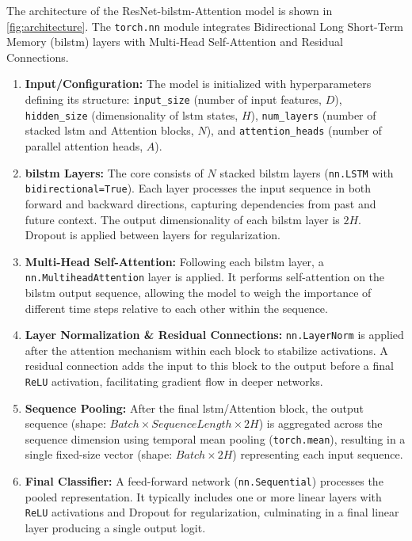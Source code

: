 The architecture of the ResNet-\gls{bilstm}-Attention model is shown in \autoref{fig:architecture}. The \texttt{torch.nn} module integrates Bidirectional Long Short-Term Memory (\gls{bilstm}) layers with Multi-Head Self-Attention and Residual Connections.

\begin{enumerate}
  \item \textbf{Input/Configuration:} The model is initialized with hyperparameters defining its structure: \texttt{input\_size} (number of input features, $D$), \texttt{hidden\_size} (dimensionality of \gls{lstm} states, $H$), \texttt{num\_layers} (number of stacked \gls{lstm} and Attention blocks, $N$), and \texttt{attention\_heads} (number of parallel attention heads, $A$).

  \item \textbf{\gls{bilstm} Layers:} The core consists of $N$ stacked \gls{bilstm} layers (\texttt{nn.LSTM} with \texttt{bidirectional=True}). Each layer processes the input sequence in both forward and backward directions, capturing dependencies from past and future context. The output dimensionality of each \gls{bilstm} layer is $2H$. Dropout is applied between layers for regularization.

  \item \textbf{Multi-Head Self-Attention:} Following each \gls{bilstm} layer, a \texttt{nn.MultiheadAttention} layer is applied. It performs self-attention on the \gls{bilstm} output sequence, allowing the model to weigh the importance of different time steps relative to each other within the sequence.

  \item \textbf{Layer Normalization \& Residual Connections:} \texttt{nn.LayerNorm} is applied after the attention mechanism within each block to stabilize activations. A residual connection adds the input to this block to the output before a final \texttt{ReLU} activation, facilitating gradient flow in deeper networks.

  \item \textbf{Sequence Pooling:} After the final \gls{lstm}/Attention block, the output sequence (shape: $Batch \times Sequence Length \times 2H$) is aggregated across the sequence dimension using temporal mean pooling (\texttt{torch.mean}), resulting in a single fixed-size vector (shape: $Batch \times 2H$) representing each input sequence.

  \item \textbf{Final Classifier:} A feed-forward network (\texttt{nn.Sequential}) processes the pooled representation. It typically includes one or more linear layers with \texttt{ReLU} activations and Dropout for regularization, culminating in a final linear layer producing a single output logit.


\end{enumerate}
